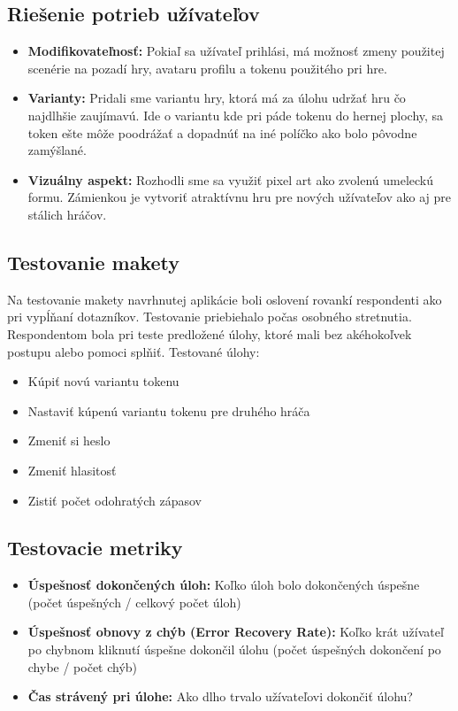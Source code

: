 \documentclass[a4paper, 11pt, onecolumn]{article}
\begin{document}
\subsection*{Riešenie potrieb užívateľov}
\begin{itemize}
  \item \textbf{Modifikovateľnosť:} Pokiaľ sa užívateľ prihlási, má možnosť zmeny 
               použitej scenérie na pozadí hry, avataru profilu a tokenu použitého pri hre.
  \item \textbf{Varianty:} Pridali sme variantu hry, ktorá má za úlohu udržať hru čo najdlhšie
                zaujímavú. Ide o variantu kde pri páde tokenu do hernej plochy, sa token
                ešte môže poodrážať a dopadnúť na iné políčko ako bolo pôvodne zamýšlané.
  \item \textbf{Vizuálny aspekt:} Rozhodli sme sa využiť pixel art ako zvolenú umeleckú formu.
                Zámienkou je vytvoriť atraktívnu hru pre nových užívateľov ako aj pre stálich hráčov.
\end{itemize}

\subsection*{Testovanie makety}
Na testovanie makety navrhnutej aplikácie boli oslovení rovankí respondenti ako pri vypĺňaní dotazníkov. Testovanie priebiehalo
počas osobného stretnutia. Respondentom bola pri teste predložené úlohy, ktoré mali bez akéhokoľvek postupu alebo pomoci splňiť.
Testované úlohy:
\begin{itemize}
  \item Kúpiť novú variantu tokenu
  \item Nastaviť kúpenú variantu tokenu pre druhého hráča
  \item Zmeniť si heslo
  \item Zmeniť hlasitosť 
  \item Zistiť počet odohratých zápasov
\end{itemize}
\subsection*{Testovacie metriky}
\begin{itemize}
    \item \textbf{Úspešnosť dokončených úloh:} Koľko úloh bolo dokončených úspešne (počet úspešných / celkový počet úloh)
    \item \textbf{Úspešnosť obnovy z chýb (Error Recovery Rate):} Koľko krát užívateľ po chybnom kliknutí úspešne dokončil úlohu (počet úspešných dokončení po chybe / počet chýb)
    \item \textbf{Čas strávený pri úlohe:} Ako dlho trvalo užívateľovi dokončiť úlohu?
\end{itemize}
\end{document}
